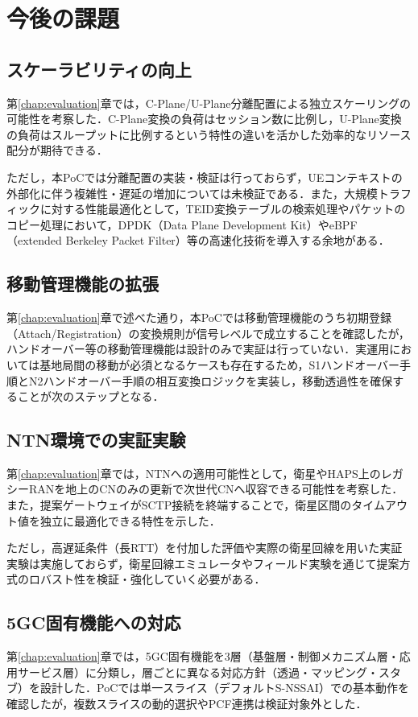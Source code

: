 \section{今後の課題}

\subsection{スケーラビリティの向上}
第\ref{chap:evaluation}章では，C-Plane/U-Plane分離配置による独立スケーリングの可能性を考察した．C-Plane変換の負荷はセッション数に比例し，U-Plane変換の負荷はスループットに比例するという特性の違いを活かした効率的なリソース配分が期待できる．

ただし，本PoCでは分離配置の実装・検証は行っておらず，UEコンテキストの外部化に伴う複雑性・遅延の増加については未検証である．また，大規模トラフィックに対する性能最適化として，TEID変換テーブルの検索処理やパケットのコピー処理において，DPDK（Data Plane Development Kit）\cite{dpdk}やeBPF（extended Berkeley Packet Filter）\cite{ebpf}等の高速化技術を導入する余地がある．

\subsection{移動管理機能の拡張}
第\ref{chap:evaluation}章で述べた通り，本PoCでは移動管理機能のうち初期登録（Attach/Registration）の変換規則が信号レベルで成立することを確認したが，ハンドオーバー等の移動管理機能は設計のみで実証は行っていない．実運用においては基地局間の移動が必須となるケースも存在するため，S1ハンドオーバー手順とN2ハンドオーバー手順の相互変換ロジックを実装し，移動透過性を確保することが次のステップとなる．

\subsection{NTN環境での実証実験}
第\ref{chap:evaluation}章では，NTNへの適用可能性として，衛星やHAPS上のレガシーRANを地上のCNのみの更新で次世代CNへ収容できる可能性を考察した．また，提案ゲートウェイがSCTP接続を終端することで，衛星区間のタイムアウト値を独立に最適化できる特性を示した．

ただし，高遅延条件（長RTT）を付加した評価や実際の衛星回線を用いた実証実験は実施しておらず，衛星回線エミュレータやフィールド実験を通じて提案方式のロバスト性を検証・強化していく必要がある．
\subsection{5GC固有機能への対応}
第\ref{chap:evaluation}章では，5GC固有機能を3層（基盤層・制御メカニズム層・応用サービス層）に分類し，層ごとに異なる対応方針（透過・マッピング・スタブ）を設計した．PoCでは単一スライス（デフォルトS-NSSAI）での基本動作を確認したが，複数スライスの動的選択やPCF連携は検証対象外とした．

